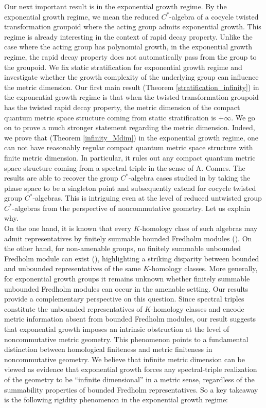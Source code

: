 \documentclass[a4paper,11pt,reqno]{amsart}
\theoremstyle{plain}
\theoremstyle{mainthmstyle}
\theoremstyle{named}
\numberwithin{equation}{section}
\begin{document}
\indent Our next important result is in the exponential growth regime. By the exponential growth regime, we mean the reduced $C^{\ast}$-algebra of a cocycle twisted transformation groupoid where the acting group admits exponential growth. This regime is already interesting in the context of rapid decay property. Unlike the case where the acting group has polynomial growth, in the exponential growth regime, the rapid decay property does not automatically pass from the group to the groupoid. We fix static stratification for exponential growth regime and investigate whether the growth complexity of the underlying group can influence the metric dimension. Our first main result (Theorem \ref{stratification_infinity}) in the exponential growth regime is that when the twisted transformation groupoid has the twisted rapid decay property, the metric dimension of the compact quantum metric space structure coming from static stratification is $+\infty$. We go on to prove a much stronger statement regarding the metric dimension. Indeed, we prove that (Theorem \ref{infinity_Mdim}) in the exponential growth regime, one can not have reasonably regular compact quantum metric space structure with finite metric dimension. In particular, it rules out any compact quantum metric space structure coming from a spectral triple in the sense of A. Connes. The results are able to recover the group $C^{\ast}$-algebra cases studied in \cite{chattopadhyay2026metric} by taking the phase space to be a singleton point and subsequently extend for cocycle twisted group $C^{\ast}$-algebras. This is intriguing even at the level of reduced untwisted group $C^{\ast}$-algebras from the perspective of noncommutative geometry. Let us explain why.\vspace{0.02in}\\
\indent On the one hand, it is known that every $K$-homology class of such algebras may admit representatives by finitely summable bounded Fredholm modules (\cite{emerson2018k}). On the other hand, for non-amenable groups, no finitely summable unbounded Fredholm module can exist (\cite{Connes1}), highlighting a striking disparity between bounded and unbounded representatives of the same $K$-homology classes. More generally, for exponential growth groups it remains unknown whether finitely summable unbounded Fredholm modules can occur in the amenable setting. Our results provide a complementary perspective on this question.  Since spectral triples constitute the unbounded representatives of $K$-homology classes and encode metric information absent from bounded Fredholm modules, our result suggests that exponential growth imposes an intrinsic obstruction at the level of noncommutative metric geometry. This phenomenon points to a fundamental distinction between homological finiteness and metric finiteness in noncommutative geometry. We believe that infinite metric dimension can be viewed as evidence that exponential growth forces any spectral-triple realization of the geometry to be ``infinite dimensional'' in a metric sense, regardless of the summability properties of bounded Fredholm representatives. So a key takeaway is the following rigidity phenomenon in the exponential growth regime:\vspace{0.05in}\\
\end{document}
